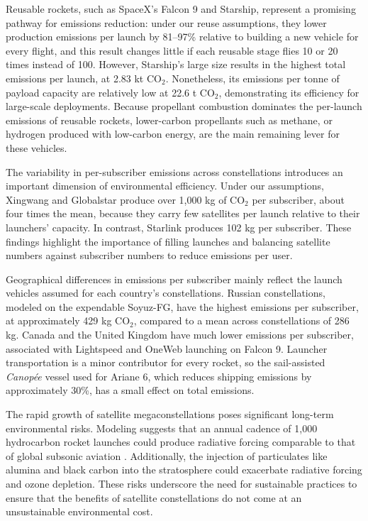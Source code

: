 \documentclass[pdflatex,sn-mathphys-num]{sn-jnl}
\theoremstyle{thmstyleone}%
\theoremstyle{thmstyletwo}%
\theoremstyle{thmstylethree}%
\begin{document}
Reusable rockets, such as SpaceX's Falcon 9 and Starship, represent a promising pathway for emissions reduction: under our reuse assumptions, they lower production emissions per launch by 81--97\% relative to building a new vehicle for every flight, and this result changes little if each reusable stage flies 10 or 20 times instead of 100. However, Starship's large size results in the highest total emissions per launch, at 2.83 kt CO$_2$. Nonetheless, its emissions per tonne of payload capacity are relatively low at 22.6 t CO$_2$, demonstrating its efficiency for large-scale deployments. Because propellant combustion dominates the per-launch emissions of reusable rockets, lower-carbon propellants such as methane, or hydrogen produced with low-carbon energy, are the main remaining lever for these vehicles.

The variability in per-subscriber emissions across constellations introduces an important dimension of environmental efficiency. Under our assumptions, Xingwang and Globalstar produce over 1,000 kg of CO$_2$ per subscriber, about four times the mean, because they carry few satellites per launch relative to their launchers' capacity. In contrast, Starlink produces 102 kg per subscriber. These findings highlight the importance of filling launches and balancing satellite numbers against subscriber numbers to reduce emissions per user.

Geographical differences in emissions per subscriber mainly reflect the launch vehicles assumed for each country's constellations. Russian constellations, modeled on the expendable Soyuz-FG, have the highest emissions per subscriber, at approximately 429 kg CO$_2$, compared to a mean across constellations of 286 kg. Canada and the United Kingdom have much lower emissions per subscriber, associated with Lightspeed and OneWeb launching on Falcon 9. Launcher transportation is a minor contributor for every rocket, so the sail-assisted \textit{Canop\'ee} vessel used for Ariane 6, which reduces shipping emissions by approximately 30\%, has a small effect on total emissions.

The rapid growth of satellite megaconstellations poses significant long-term environmental risks. Modeling suggests that an annual cadence of 1,000 hydrocarbon rocket launches could produce radiative forcing comparable to that of global subsonic aviation \citep{boley_satellite_2021}. Additionally, the injection of particulates like alumina and black carbon into the stratosphere could exacerbate radiative forcing and ozone depletion. These risks underscore the need for sustainable practices to ensure that the benefits of satellite constellations do not come at an unsustainable environmental cost.
\end{document}

